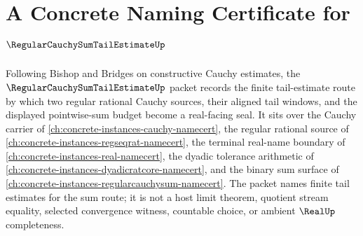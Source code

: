 \chapter{A Concrete Naming Certificate for $\RegularCauchySumTailEstimateUp$}
\label{ch:concrete-instances-regular-cauchy-sum-tail-estimate-namecert}

Following Bishop and Bridges on constructive Cauchy estimates, the $\RegularCauchySumTailEstimateUp$ packet records the finite tail-estimate route by which two regular rational Cauchy sources, their aligned tail windows, and the displayed pointwise-sum budget become a real-facing seal. It sits over the Cauchy carrier of \autoref{ch:concrete-instances-cauchy-namecert}, the regular rational source of \autoref{ch:concrete-instances-regseqrat-namecert}, the terminal real-name boundary of \autoref{ch:concrete-instances-real-namecert}, the dyadic tolerance arithmetic of \autoref{ch:concrete-instances-dyadicratcore-namecert}, and the binary sum surface of \autoref{ch:concrete-instances-regularcauchysum-namecert}. The packet names finite tail estimates for the sum route; it is not a host limit theorem, quotient stream equality, selected convergence witness, countable choice, or ambient $\RealUp$ completeness.

